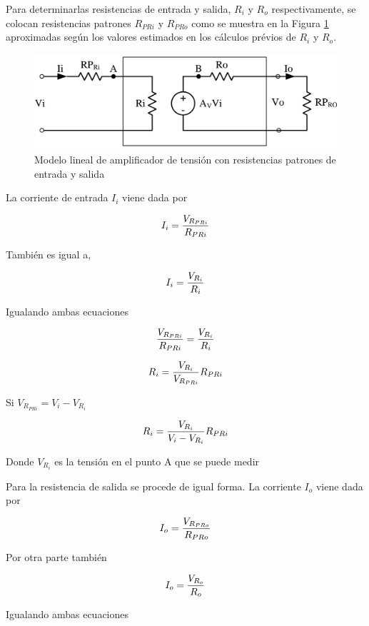 \documentclass[12pt, a4paper]{article}
\begin{document}
    Para determinarlas resistencias de entrada y salida, $R_i$ y $R_o$ respectivamente, se colocan resistencias patrones $R_{PRi}$ y $R_{PRo}$ como se muestra en la Figura \ref{fig:rp} aproximadas según los valores estimados en los cálculos prévios de $R_i$ y $R_o$.

    \begin{figure}
        \centering
        \includegraphics[height=5cm\textwidth]{RPdiagrama.jpg}
        \caption{Modelo lineal de amplificador de tensión con resistencias patrones de entrada y salida}
        \label{fig:rp}
    \end{figure}

    La corriente de entrada $I_i$ viene dada por

    $$I_i = {V_{R_{PRi}} \over R_{PRi}}$$

    También es igual a,

    $$I_i = {V_{R_{i}} \over R_{i}}$$

    Igualando ambas ecuaciones

    $${V_{R_{PRi}} \over R_{PRi}} = {V_{R_{i}} \over R_{i}}$$

    $$R_i = {V_{R_{i}} \over V_{R_{PRi}}}R_{PRi}$$

    Si $V_{R_{PRi}} = V_i - V_{R_{i}}$

    \begin{equation} \label{eqri}
        R_i = {V_{R_{i}} \over V_i - V_{R_{i}}}R_{PRi}
    \end{equation}

    Donde $V_{R_i}$ es la tensión en el punto A que se puede medir

    Para la resistencia de salida se procede de igual forma. La corriente $I_o$ viene dada por

    $$I_o = {V_{R_{PRo}} \over R_{PRo}}$$

    Por otra parte también

    $$I_o = {V_{R_o} \over R_o}$$

    Igualando ambas ecuaciones
\end{document}

